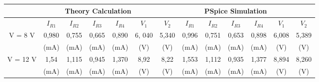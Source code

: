 {\scriptsize\begin{tabular}{|c|c|c|c|c|c|c|c|c|c|c|c|c|}
    \hline
     & \multicolumn{5}{c}{Theory Calculation} & & \multicolumn{5}{c}{PSpice Simulation} &\\
    \hline
    & \(I_{R1}\) & \(I_{R2}\) & \(I_{R3}\) & \(I_{R4}\) & \(V_1\) & \(V_2\) & \(I_{R1}\) & \(I_{R2}\) & \(I_{R3}\) & \(I_{R4}\) & \(V_1\) & \(V_2\)\\
    \hline
    V = 8 V & 0,980 & 0,755 & 0,665 & 0,890 & 6, 040 & 5,340 & 0,996 & 0,751 & 0,653 & 0,898 & 6,008 & 5,389\\
& (mA) & (mA) & (mA) & (mA) & (V) & (V) & (mA) & (mA) & (mA) & (mA) & (V) & (V)\\
\hline
V = 12 V & 1,54 & 1,115 & 0,945 & 1,370 & 8,92 & 8,22 & 1,553 & 1,112 & 0,935 & 1,377 & 8,894 & 8,260\\
& (mA) & (mA) & (mA) & (mA) & (V) & (V) & (mA) & (mA) & (mA) & (mA) & (V) & (V)\\
\hline
\end{tabular}}
\pagebreak
